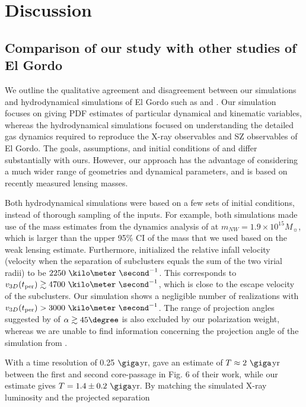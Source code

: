 \section{Discussion}
\subsection{Comparison of our study with other studies of El Gordo}
We outline the qualitative agreement and disagreement between our
simulations and hydrodynamical simulations of El Gordo such as
\cite{Donnert13} and \cite{Molnar14}. Our simulation focuses on giving PDF
estimates of particular dynamical and kinematic variables, whereas the
hydrodynamical simulations focused on understanding the detailed gas dynamics
required to reproduce the X-ray observables and SZ 
observables of El Gordo. The goals,
assumptions, and initial conditions of \cite{Donnert13} and \cite{Molnar14}
differ substantially with ours. However, our approach has the advantage of considering a much wider range of geometries and dynamical parameters, and is based on recently measured lensing masses.
\par 
Both hydrodynamical simulations were based on a few sets of initial
conditions, instead of thorough sampling of the inputs. For example, both
simulations made use of the mass estimates from the dynamics analysis
of  at $m_{NW} = 1.9 \times
10^{15} M_{\sun}$,
which is larger than the upper 95\% CI of the mass that we used based on
the weak lensing estimate.
Furthermore, \cite{Molnar14} initialized the relative infall velocity
(velocity when the separation of subclusters equals the sum of the two virial
radii) to be $2250~\kilo \meter~ \second^{-1}$. This corresponds to
$v_{3D}(t_{\rm per}) \gtrsim 4700~\kilo \meter~\second^{-1}$, which is close to
the escape velocity of the subclusters. 
Our simulation shows 
a negligible number of realizations with $v_{3D}(t_{\rm per}) >
3000~\kilo\meter~\second^{-1}$. 
The range of projection angles suggested by
\cite{Molnar14} of $\alpha \gtrsim 45\degree$ is also excluded by our
polarization weight, whereas we are unable to find information concerning
the projection angle of the simulation from \cite{Donnert13}.\par 
With a time resolution of 0.25 $\giga$yr,
\cite{Donnert13} gave an estimate of  $T\approx 2~\giga$yr between the
first and second core-passage in Fig. 6 of their work, while our estimate gives $T
= 1.4\pm {0.2}~\giga$yr. 
By matching the simulated X-ray luminosity and the projected separation
